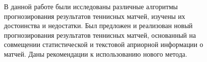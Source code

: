 \Conclusion %

\begin{figure}
В данной работе были исследованы различные алгоритмы прогнозирования результатов теннисных матчей, изуче­ны их достоинства и недостатки. 
Был предложен и реализован новый прогнозирования результатов теннисных матчей, основанный на совмещении статистической и текстовой априорной информации о матчей.
Даны рекомендации к использованию нового метода.
\end{figure}
